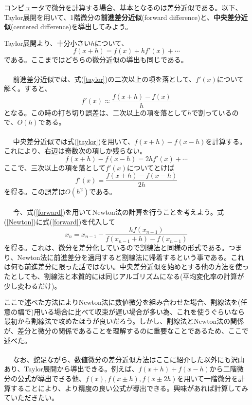 コンピュータで微分を計算する場合、基本となるのは差分近似である。以下、Taylor展開を用いて、1階微分の\textbf{前進差分近似}(forward difference)と、\textbf{中央差分近似}(centered difference)を導出してみよう。

Taylor展開より、十分小さい$h$について、
\begin{equation}
f(x+h)=f(x)+hf'(x)+\cdots \label{taylor}
\end{equation}
である。ここまではどちらの微分近似の導出も同じである。
\\ \\　
前進差分近似では、式(\ref{taylor})の二次以上の項を落として、$f'(x)$について解く。すると、
\begin{equation}
f'(x)\approx \frac{f(x+h)-f(x)}{h} \label{forward}
\end{equation}
となる。この時の打ち切り誤差は、二次以上の項を落として$h$で割っているので、$O(h)$である。
\\ \\　
中央差分近似では式(\ref{taylor})を用いて、$f(x+h)-f(x-h)$を計算する。これにより、右辺は奇数次の項しか残らない。
\begin{equation}
f(x+h)-f(x-h)=2hf'(x)+\cdots
\end{equation}
ここで、三次以上の項を落として$f'(x)$についてとけば
\begin{equation}
f'(x)=\frac{f(x+h)-f(x-h)}{2h} \label{centered}
\end{equation}
を得る。この誤差は$O(h^2)$である。
\\ \\　
今、式(\ref{forward})を用いてNewton法の計算を行うことを考えよう。式(\ref{Newton})に式(\ref{forward})を代入して
\begin{equation}
x_{n}=x_{n-1}-\frac{hf(x_{n-1})}{f(x_{n-1}+h)-f(x_{n-1})}
\end{equation}
を得る。これは、微分を差分化しているので割線法と同様の形式である。つまり、Newton法に前進差分を適用すると割線法に帰着するという事である。これは何も前進差分に限った話ではない。中央差分近似を始めとする他の方法を使ったとしても、割線法と本質的には同じアルゴリズムになる(平均変化率の計算が少し変わるだけ)。

ここで述べた方法によりNewton法に数値微分を組み合わせた場合、割線法を(任意の幅で)用いる場合に比べて収束が遅い場合が多い為、これを使うぐらいなら最初から割線法で攻めたほうが良いだろう。しかし、割線法とNewton法の関係が、差分と微分の関係であることを理解するのに重要なことであるため、ここで述べた。
\\ \\　
なお、蛇足ながら、数値微分の差分近似方法はここに紹介した以外にも沢山あり、Taylor展開から導出できる。例えば、$f(x+h)+f(x-h)$から二階微分の公式が導出できる他、$f(x),f(x\pm h),f(x\pm 2h)$を用いて一階微分を計算することにより、より精度の良い公式が導出できる。興味があれば計算してみていただきたい。

